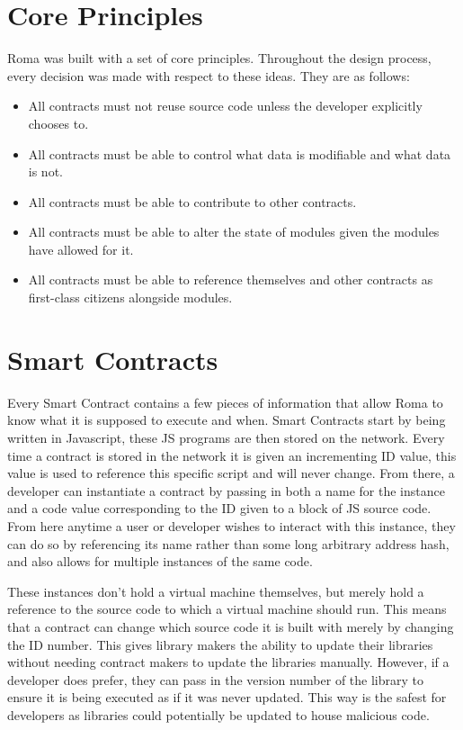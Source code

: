 \documentclass[a4paper]{article}
\begin{document}
\section{Core Principles}\label{sec:core-principles}
Roma was built with a set of core principles.
Throughout the design process, every decision was made with respect to these ideas.
They are as follows:
\begin{itemize}
  \item All contracts must not reuse source code unless the developer explicitly chooses to.
  \item All contracts must be able to control what data is modifiable and what data is not.
  \item All contracts must be able to contribute to other contracts.
  \item All contracts must be able to alter the state of modules given the modules have allowed for it.
  \item All contracts must be able to reference themselves and other contracts as first-class citizens alongside modules.
\end{itemize}


\section{Smart Contracts}\label{sec:smart-contracts}
Every Smart Contract contains a few pieces of information that allow Roma to know what it is supposed to execute and when.
Smart Contracts start by being written in Javascript, these JS programs are then stored on the network.
Every time a contract is stored in the network it is given an incrementing ID value, this value is used to reference this specific script and will never change.
From there, a developer can instantiate a contract by passing in both a name for the instance and a code value corresponding to the ID given to a block of JS source code.
From here anytime a user or developer wishes to interact with this instance, they can do so by referencing its name rather than some long arbitrary address hash, and also allows for multiple instances of the same code.

These instances don't hold a virtual machine themselves, but merely hold a reference to the source code to which a virtual machine should run.
This means that a contract can change which source code it is built with merely by changing the ID number.
This gives library makers the ability to update their libraries without needing contract makers to update the libraries manually.
However, if a developer does prefer, they can pass in the version number of the library to ensure it is being executed as if it was never updated.
This way is the safest for developers as libraries could potentially be updated to house malicious code.
\end{document}
